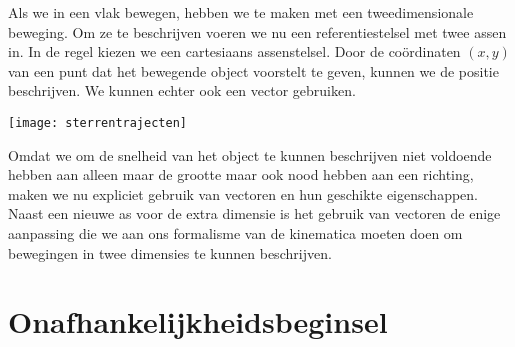 \documentclass{ximera}
\begin{document}
	\author{Bart Lambregs}
    \xmsource


	Als we in een vlak bewegen, hebben we te maken met een tweedimensionale beweging. 
	Om ze te beschrijven voeren we nu een referentiestelsel met twee assen in. In de regel kiezen we een cartesiaans assenstelsel.  Door de co\"ordinaten $(x,y)$ van een punt dat het bewegende object voorstelt te geven, kunnen we de positie beschrijven. We kunnen echter ook een vector gebruiken.
	\begin{image}
	
	\texttt{[image: sterrentrajecten]}
	\end{image}

	Omdat we om de snelheid van het object te kunnen beschrijven niet voldoende hebben aan alleen maar de grootte maar ook nood hebben aan een richting, maken we nu expliciet gebruik van vectoren en hun geschikte eigenschappen. Naast een nieuwe as voor de extra dimensie is het gebruik van vectoren de enige aanpassing die we aan ons formalisme van de kinematica moeten doen om bewegingen in twee dimensies te kunnen beschrijven.
	

	\section{Onafhankelijkheidsbeginsel}
	
\end{document}
